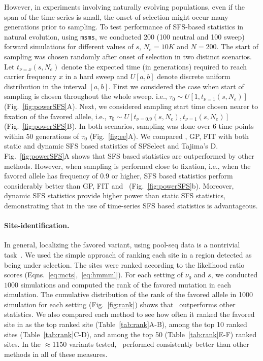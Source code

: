 However, in experiments involving naturally evolving populations,
even if the span of the time-series is small, the onset of selection
might occur many generations prior to sampling. To test performance of
SFS-based statistics in natural evolution, using \texttt{msms}, we conducted 
200 (100
neutral and 100 sweep) forward simulations for different values of
$s$, $N_e=10K$ and $N=200$. The start
of sampling was chosen randomly after onset of selection in two distinct 
scenarios. Let $t_{\nu=x}(s,N_e)$ denote
the expected time (in generations) required to reach carrier frequency
$x$ in a hard sweep and $U[a,b]$ denote discrete uniform distribution
in the interval $[a,b]$. First we considered the case when start of
sampling is chosen throughout the whole sweep. i.e., $\tau_0 \sim
U\left[1,t_{\nu=1}(s,N_e)\right]$ (Fig.~\ref{fig:powerSFS}A). Next, we
considered sampling start time chosen nearer to fixation of the
favored allele, i.e., $\tau_0 \sim
U\left[t_{\nu=0.9}(s,N_e),t_{\nu=1}(s,N_e)\right]$
(Fig.~\ref{fig:powerSFS}B). In both scenarios, sampling was done over
$6$ time points within $50$ generations of $\tau_0$ (Fig.~\ref{fig:ee}A). We 
compared
\comale, GP, FIT with both static and dynamic SFS based statistics of
SFSelect and Tajima's D. Fig.~\ref{fig:powerSFS}A shows that SFS based
statistics are outperformed by other methods. However,
when sampling is performed close to fixation, i.e., when the favored
allele has frequency of 0.9 or higher, SFS based statistics perform
considerably better than GP, FIT and \comale\
(Fig.~\ref{fig:powerSFS}b). Moreover, dynamic SFS statistics
provide higher power than static SFS statistics, demonstrating that in the use 
of time-series SFS based statistics is advantageous.


\paragraph{Site-identification.}
In general, localizing the favored variant, using pool-seq data is a nontrivial 
task~\cite{tobler2014massive}. We used the simple
approach of ranking each site in a region detected as being under
selection. The sites were ranked according to the likelihood ratio
scores (Eqns.~\ref{eq:mcts},~\ref{eq:hmmml}). For each setting of
$\nu_0$ and $s$, we conducted $1000$ simulations and computed the rank
of the favored mutation in each simulation. The cumulative
distribution of the rank of the favored allele in 1000 simulation for
each setting (Fig.~\ref{fig:rank}) shows that \comale\ outperforms
other statistics. We also compared each method to see how often it
ranked the favored site in as the top ranked site
(Table~\ref{tab:rank}A-B), among the top 10 ranked sites
(Table~\ref{tab:rank}C-D), and among the top 50
(Table~\ref{tab:rank}E-F) ranked sites. In the $\approx$1150 variants tested,
\comale\ performed consistently better than other methods in all of
these measures.

